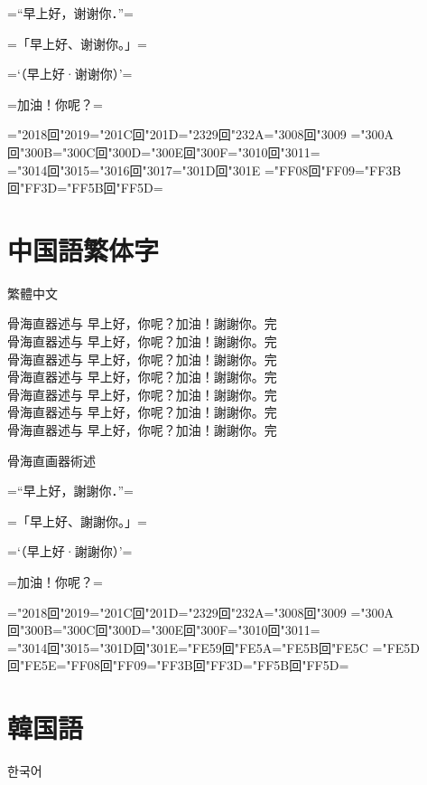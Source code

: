 \documentclass[landscape]{utarticle}
\begin{document}
\upschrmm
=“早上好，谢谢你．”=

=「早上好、谢谢你。」=

=‘（早上好·谢谢你）’=

=加油！你呢？=

=\kchar"2018回\kchar"2019=\kchar"201C回\kchar"201D=\kchar"2329回\kchar"232A=\kchar"3008回\kchar"3009%
=\kchar"300A回\kchar"300B=\kchar"300C回\kchar"300D=\kchar"300E回\kchar"300F=\kchar"3010回\kchar"3011=\\
=\kchar"3014回\kchar"3015=\kchar"3016回\kchar"3017=\kchar"301D回\kchar"301E%
=\kchar"FF08回\kchar"FF09=\kchar"FF3B回\kchar"FF3D=\kchar"FF5B回\kchar"FF5D=

\newpage

\section{中国語繁体字}
\upschgtb 繁體中文

\uptchrml 骨海直器述与 早上好，你呢？加油！謝謝你。完\\
\uptchrmm 骨海直器述与 早上好，你呢？加油！謝謝你。完\\
\uptchrmb 骨海直器述与 早上好，你呢？加油！謝謝你。完\\
\uptchgtm 骨海直器述与 早上好，你呢？加油！謝謝你。完\\
\uptchgtb 骨海直器述与 早上好，你呢？加油！謝謝你。完\\
\uptchgte 骨海直器述与 早上好，你呢？加油！謝謝你。完\\
\uptchgth 骨海直器述与 早上好，你呢？加油！謝謝你。完\\

\uptchrmm

骨海直画器術述

=“早上好，謝謝你．”=

=「早上好、謝謝你。」=

=‘（早上好·謝謝你）’=

=加油！你呢？=

=\kchar"2018回\kchar"2019=\kchar"201C回\kchar"201D=\kchar"2329回\kchar"232A=\kchar"3008回\kchar"3009%
=\kchar"300A回\kchar"300B=\kchar"300C回\kchar"300D=\kchar"300E回\kchar"300F=\kchar"3010回\kchar"3011=\\
=\kchar"3014回\kchar"3015=\kchar"301D回\kchar"301E=\kchar"FE59回\kchar"FE5A=\kchar"FE5B回\kchar"FE5C%
=\kchar"FE5D回\kchar"FE5E=\kchar"FF08回\kchar"FF09=\kchar"FF3B回\kchar"FF3D=\kchar"FF5B回\kchar"FF5D=

\section{韓国語}
\upkorgtb 한국어
\end{document}
